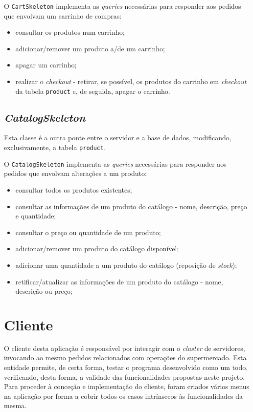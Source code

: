 \documentclass[a4paper]{report}
\begin{document}
{			O \texttt{CartSkeleton} implementa as \textit{queries} necessárias para responder aos pedidos que envolvam um carrinho de compras:
			\begin{itemize}
				\item consultar os produtos num carrinho;
				\item adicionar/remover um produto a/de um carrinho;
				\item apagar um carrinho;
				\item realizar o \textit{checkout} - retirar, se possível, os produtos do carrinho em \textit{checkout} da tabela \texttt{product} e, de seguida, apagar o carrinho.
			\end{itemize}

		\subsection{\textit{CatalogSkeleton}} \label{subsec:ServerCatalogSkeleton}
			Esta classe é a outra ponte entre o servidor e a base de dados, modificando, exclusivamente, a tabela \texttt{product}.

			O \texttt{CatalogSkeleton} implementa as \textit{queries} necessárias para responder aos pedidos que envolvam alterações a um produto:
			\begin{itemize}
				\item consultar todos os produtos existentes;
				\item consultar as informações de um produto do catálogo - nome, descrição, preço e quantidade;
				\item consultar o preço ou quantidade de um produto;
				\item adicionar/remover um produto do catálogo disponível;
				\item adicionar uma quantidade a um produto do catálogo (reposição de \textit{stock});
				\item retificar/atualizar as informações de um produto do catálogo - nome, descrição ou preço;
			\end{itemize}
	
	\section{Cliente} \label{sec:Client}
		O cliente desta aplicação é responsável por interagir com o \textit{cluster} de servidores, invocando ao mesmo pedidos relacionados com operações do supermercado.
		Esta entidade permite, de certa forma, testar o programa desenvolvido como um todo, verificando, desta forma, a validade das funcionalidades propostas neste projeto.
		Para proceder à conceção e implementação do cliente, foram criados vários menus na aplicação por forma a cobrir todos os casos intrínsecos às funcionalidades da mesma.

}
\end{document}
